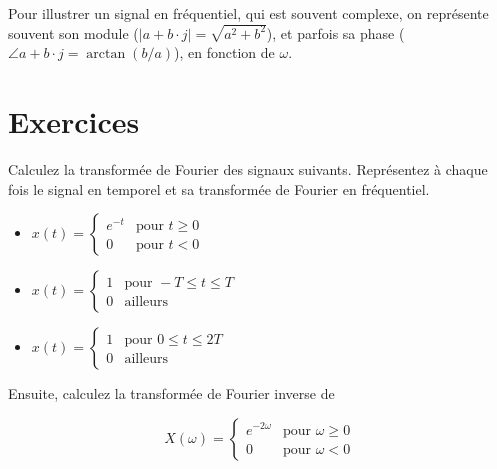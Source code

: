 \documentclass [a4paper, 11pt] {article}
\begin{document}
    Pour illustrer un signal en fréquentiel, qui est souvent complexe, on représente souvent son module ($|a+b\cdot j| = \sqrt{a^2 + b^2}$), et parfois sa phase ($\angle a+b\cdot j = \arctan (b/a)$), en fonction de $\omega$.
    
    
    \pagebreak
    \pagestyle{nextpages}
    \part*{Exercices}
    
    \begin{exercice}[Calculs]{1}
        Calculez la transformée de Fourier des signaux suivants. Représentez à chaque fois le signal en temporel et sa transformée de Fourier en fréquentiel.
        
        \begin{itemize}
            \item $x(t)=\left\{\begin{array}{ll}e^{-t}&\mbox{pour }t\geq 0\\0&\mbox{pour }t<0\end{array}\right.$
            \item $x(t)=\left\{\begin{array}{ll}1&\mbox{pour }-T\leq t\leq T\\0&\mbox{ailleurs}\end{array}\right.$
            \item $x(t)=\left\{\begin{array}{ll}1&\mbox{pour } 0\leq t\leq 2T\\0&\mbox{ailleurs}\end{array}\right.$
        \end{itemize}
    
        Ensuite, calculez la transformée de Fourier inverse de
    
        \begin{equation}
        X(\omega)=\left\{\begin{array}{ll}e^{-2\omega}&\mbox{pour } \omega \geq 0\\0&\mbox{pour } \omega<0 \end{array}\right.
        \end{equation}


    \end{exercice}
        
\end{document}
